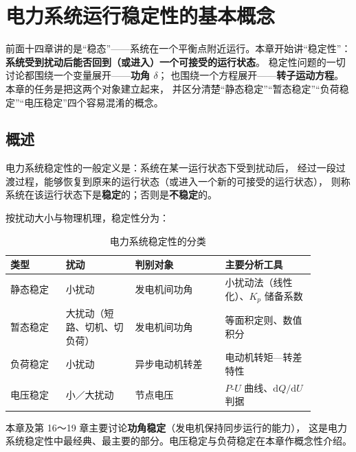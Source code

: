 
\chapter{电力系统运行稳定性的基本概念}

前面十四章讲的是“稳态”——系统在一个平衡点附近运行。本章开始讲“稳定性”：
\textbf{系统受到扰动后能否回到（或进入）一个可接受的运行状态}。
稳定性问题的一切讨论都围绕一个变量展开——\textbf{功角 $\delta$}；
也围绕一个方程展开——\textbf{转子运动方程}。本章的任务是把这两个对象建立起来，
并区分清楚“静态稳定”“暂态稳定”“负荷稳定”“电压稳定”四个容易混淆的概念。

\section{概述}

电力系统稳定性的一般定义是：系统在某一运行状态下受到扰动后，
经过一段过渡过程，能够恢复到原来的运行状态（或进入一个新的可接受的运行状态），
则称系统在该运行状态下是\textbf{稳定}的；否则是\textbf{不稳定}的。

按扰动大小与物理机理，稳定性分为：

\begin{table}[htbp]
  \centering
  \caption{电力系统稳定性的分类}
  \small
  \begin{tabular}{@{}p{0.16\linewidth}p{0.20\linewidth}p{0.26\linewidth}p{0.26\linewidth}@{}}
    \toprule
    类型 & 扰动 & 判别对象 & 主要分析工具 \\
    \midrule
    静态稳定 & 小扰动 & 发电机间功角 & 小扰动法（线性化）、$K_p$ 储备系数 \\
    暂态稳定 & 大扰动（短路、切机、切负荷） & 发电机间功角 & 等面积定则、数值积分 \\
    负荷稳定 & 小扰动 & 异步电动机转差 & 电动机转矩—转差特性 \\
    电压稳定 & 小／大扰动 & 节点电压 & $P$-$U$ 曲线、$\mathrm{d}Q/\mathrm{d}U$ 判据 \\
    \bottomrule
  \end{tabular}
\end{table}

本章及第 16～19 章主要讨论\textbf{功角稳定}（发电机保持同步运行的能力），
这是电力系统稳定性中最经典、最主要的部分。电压稳定与负荷稳定在本章作概念性介绍。

